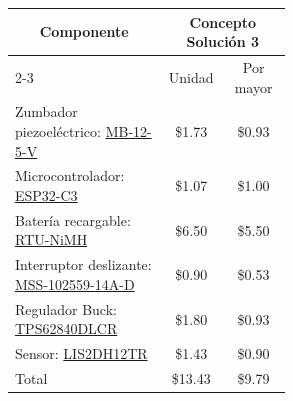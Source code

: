 \begin{itemize}
\begin{table}[H]
\centering
{}
\begin{tabular}{|p{0.55\linewidth}|c|c|} 
\hline
\multicolumn{1}{|c|}{\multirow{2}{*}{Componente}} & \multicolumn{2}{c|}{Concepto Solución 3} \\ 
\cline{2-3}
\multicolumn{1}{|c|}{} & Unidad & Por mayor \\ 
\hline
Zumbador piezoeléctrico: \href{https://www.digikey.com/en/products/detail/visaton-gmbh-co-kg/MB-12-5-V/10650231}{MB-12-5-V} & \$1.73 & \$0.93 \\ 
\hline
Microcontrolador: \href{https://www.digikey.com/en/products/detail/espressif-systems/ESP32-C3/14115579}{ESP32-C3} & \$1.07 & \$1.00 \\ 
\hline
Batería recargable: \href{https://www.digikey.com/en/products/detail/pkcell/RTU-NiMH-9V250-1B/22152886}{RTU-NiMH} & \$6.50 & \$5.50 \\ 
\hline
Interruptor deslizante: \href{https://www.digikey.com/en/products/detail/same-sky-formerly-cui-devices/MSS-102559-14A-D/13978983}{MSS-102559-14A-D} & \$0.90 & \$0.53 \\ 
\hline
Regulador Buck: \href{https://www.digikey.com/en/products/detail/texas-instruments/TPS62840DLCR/10445071}{TPS62840DLCR} & \$1.80 & \$0.93 \\ 
\hline
Sensor: \href{https://www.digikey.com/en/products/detail/stmicroelectronics/LIS2DH12TR/4899892?s=N4IgTCBcDaIDIEkDKYAiAJAjGABCAugL5A}{LIS2DH12TR} & \$1.43 & \$0.90 \\ 
\hhline{|===|}
Total & \$13.43 & \$9.79 \\
\hline
\end{tabular}
\end{table}


\end{itemize}
%



